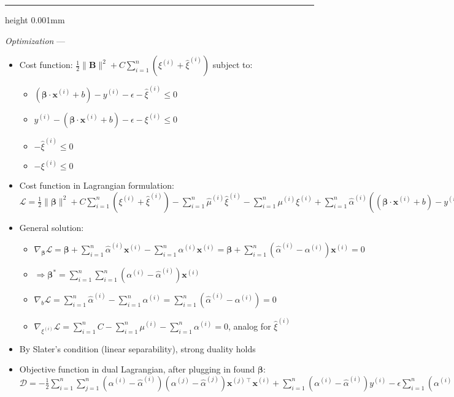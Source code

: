 {\color{lightgray}\hrule height 0.001mm}

\emph{Optimization} ---
\begin{itemize}
    \item Cost function: $\frac{1}{2} \| \boldsymbol{B} \|^2 + C \sum_{i=1}^n (\xi^{(i)} + \hat{\xi}^{(i)})$ subject to:
    \begin{itemize}
        \item $(\boldsymbol{\beta} \cdot \boldsymbol{x}^{(i)} + b) - y^{(i)} - \epsilon - \hat{\xi}^{(i)} \leq 0$ 
        \item $y^{(i)} - (\boldsymbol{\beta} \cdot \boldsymbol{x}^{(i)} + b) - \epsilon - \xi^{(i)} \leq 0$
        \item $-\hat{\xi}^{(i)} \leq 0$
        \item $-\xi^{(i)} \leq 0$
    \end{itemize}
    \item Cost function in Lagrangian formulation: $\mathcal{L} = \frac{1}{2} \| \boldsymbol{\beta} \|^2 + C \sum_{i=1}^n (\xi^{(i)} + \hat{\xi}^{(i)}) - \sum_{i=1}^n \hat{\mu}^{(i)} \hat{\xi}^{(i)} - \sum_{i=1}^n \mu^{(i)} \xi^{(i)} + \sum_{i=1}^n \hat{\alpha}^{(i)}((\boldsymbol{\beta} \cdot \boldsymbol{x}^{(i)} + b) - y^{(i)} - \epsilon - \hat{\xi}^{(i)}) + \sum_{i=1}^n \alpha^{(i)} (y^{(i)} - (\boldsymbol{\beta} \cdot \boldsymbol{x}^{(i)} + b) - \epsilon - \xi^{(i)})$
    \item General solution:
    \begin{itemize}
        \item $\nabla_{\boldsymbol{\beta}} \mathcal{L} = \boldsymbol{\beta} + \sum_{i=1}^n \hat{\alpha}^{(i)} \boldsymbol{x}^{(i)} - \sum_{i=1}^n \alpha^{(i)} \boldsymbol{x}^{(i)} = \boldsymbol{\beta} + \sum_{i=1}^n (\hat{\alpha}^{(i)} - \alpha^{(i)}) \boldsymbol{x}^{(i)} = 0$
        \item $\Rightarrow \boldsymbol{\beta}^{*} = \sum_{i=1}^n \sum_{i=1}^n (\alpha^{(i)} - \hat{\alpha}^{(i)} ) \boldsymbol{x}^{(i)}$
        \item $\nabla_b \mathcal{L} = \sum_{i=1}^n \hat{\alpha}^{(i)} - \sum_{i=1}^n \alpha^{(i)} = \sum_{i=1}^n (\hat{\alpha}^{(i)} - \alpha^{(i)}) = 0$
        \item $\nabla_{\xi^{(i)}} \mathcal{L} = \sum_{i=1}^n C - \sum_{i=1}^n \mu^{(i)} - \sum_{i=1}^n \alpha^{(i)} = 0$, analog for $\hat{\xi}^{(i)}$
    \end{itemize}
    \item By Slater's condition (linear separability), strong duality holds
    \item Objective function in dual Lagrangian, after plugging in found $\boldsymbol{\beta}$: $\mathcal{D} = -\frac{1}{2} \sum_{i=1}^n \sum_{j=1}^n (\alpha^{(i)} - \hat{\alpha}^{(i)})(\alpha^{(j)} - \hat{\alpha}^{(j)}) \boldsymbol{x}^{(j)\intercal} \boldsymbol{x}^{(i)} + \sum_{i=1}^n (\alpha^{(i)} - \hat{\alpha}^{(i)}) y^{(i)} - \epsilon \sum_{i=1}^n (\alpha^{(i)} + \hat{\alpha}^{(i)})$\\

\end{itemize}
